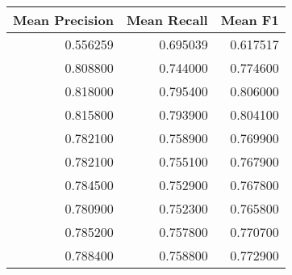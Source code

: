 \begin{tabular}{rrr}
\toprule
Mean Precision & Mean Recall & Mean F1 \\
\midrule
0.556259 & 0.695039 & 0.617517 \\
0.808800 & 0.744000 & 0.774600 \\
0.818000 & 0.795400 & 0.806000 \\
0.815800 & 0.793900 & 0.804100 \\
0.782100 & 0.758900 & 0.769900 \\
0.782100 & 0.755100 & 0.767900 \\
0.784500 & 0.752900 & 0.767800 \\
0.780900 & 0.752300 & 0.765800 \\
0.785200 & 0.757800 & 0.770700 \\
0.788400 & 0.758800 & 0.772900 \\
\bottomrule
\end{tabular}
